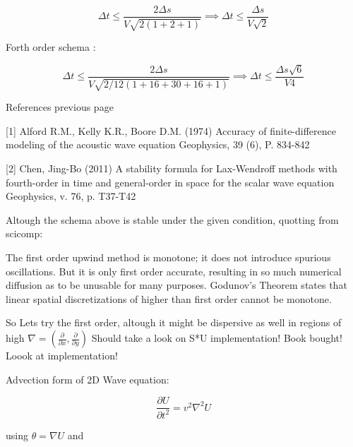 \documentclass[legalpaper, 12pt]{article}
\begin{document}
$$ \Delta t \leq \frac{2 \Delta s}{ V \sqrt{2(1+2+1)}} \implies \Delta t \leq \frac{ \Delta s}{ V \sqrt{2}} $$

Forth order schema :

$$ \Delta t \leq \frac{2 \Delta s}{ V \sqrt{2/12(1+16+30+16+1)}} \implies \Delta t \leq \frac{ \Delta s \sqrt{6}}{ V 4} $$

\newpage

References previous page

[1] Alford R.M., Kelly K.R., Boore D.M. (1974) Accuracy of finite-difference modeling of the acoustic wave equation Geophysics, 39 (6), P. 834-842

[2] Chen, Jing-Bo (2011) A stability formula for Lax-Wendroff methods with fourth-order in time and general-order in space for the scalar wave equation Geophysics, v. 76, p. T37-T42

\newpage

Altough the schema above is stable under the given condition, quotting from scicomp:

The first order upwind method is monotone; it does not introduce spurious oscillations. But it is only first order accurate, resulting in so much numerical diffusion as to be unusable for many purposes. Godunov's Theorem states that linear spatial discretizations of higher than first order cannot be monotone.

So Lets try the first order, altough it might be dispersive as well in regions of high $ \nabla = ( \frac{\partial}{\partial x}, \frac{\partial}{\partial y} ) $ Should take a look on S*U implementation! Book bought! Loook at implementation!


\newpage


\medspace
\medspace
Advection form of 2D Wave equation:
\medspace

$$ \frac{\partial U}{\partial t ^2} = v^2 \nabla^2 U $$ 

using $\theta = \nabla U $ and 
\end{document}
